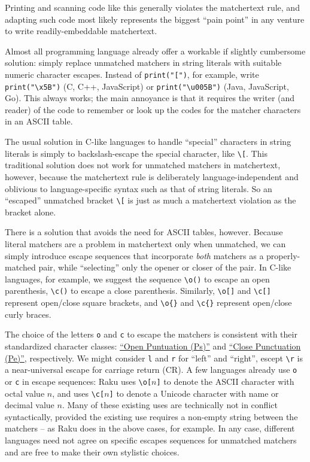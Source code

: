 Printing and scanning code like this generally violates the matchertext rule,
and adapting such code most likely represents the biggest ``pain point''
in any venture to write readily-embeddable matchertext.

Almost all programming language already offer a workable
if slightly cumbersome solution:
simply replace unmatched matchers in string literals
with suitable numeric character escapes.
Instead of \verb|print("[")|, for example,
write \verb|print("\x5B")| (C, C++, JavaScript)
or \verb|print("\u005B")| (Java, JavaScript, Go).
This always works;
the main annoyance is that it requires the writer (and reader) of the code
to remember or look up the codes for the matcher characters in an ASCII table.

The usual solution in C-like languages
to handle ``special'' characters in string literals
is simply to backslash-escape the special character,
like \verb|\[|.
This traditional solution does not work for unmatched matchers in matchertext,
however,
because the matchertext rule is deliberately language-independent
and oblivious to language-specific syntax such as that of string literals.
So an ``escaped'' unmatched bracket \verb|\[|
is just as much a matchertext violation as the bracket alone.

There is a solution that avoids the need for ASCII tables, however.
Because literal matchers are a problem in matchertext only when unmatched,
we can simply introduce escape sequences that incorporate
\emph{both} matchers as a properly-matched pair,
while ``selecting'' only the opener or closer of the pair.
In C-like languages, for example,
we suggest the sequence \verb|\o()| to escape an open parenthesis,
\verb|\c()| to escape a close parenthesis.
Similarly,
\verb|\o[]| and \verb|\c[]| represent open/close square brackets,
and \verb|\o{}| and \verb|\c{}| represent open/close curly braces.

The choice of the letters \verb|o| and \verb|c| to escape the matchers
is consistent with their standardized character classes:
\href{https://www.compart.com/en/unicode/category/Ps}{``Open Puntuation (Ps)''}
and
\href{https://www.compart.com/en/unicode/category/Pe}{``Close Punctuation (Pe)''},
respectively.
We might consider \verb|l| and \verb|r| for ``left'' and ``right'',
escept \verb|\r| is a near-universal escape for carriage return (CR).
A few languages already use \verb|o| or \verb|c| in escape sequences:
\eg Raku uses \verb|\o[|$n$\verb|]|
to denote the ASCII character with octal value $n$,
and uses \verb|\c[|$n$\verb|]|
to denote a Unicode character with name or decimal value $n$.
Many of these existing uses are technically not in conflict syntactically,
provided the existing use requires a non-empty string between the matchers --
as Raku does in the above cases, for example.
In any case, different languages need not agree
on specific escapes sequences for unmatched matchers
and are free to make their own stylistic choices.



